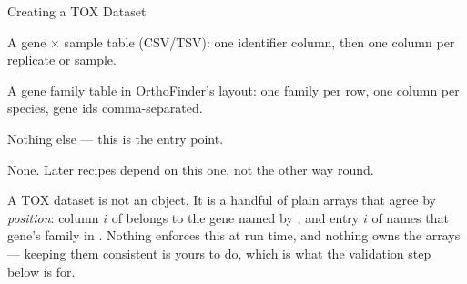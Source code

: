 
\begin{recipe}[label=sub:tox-dataset]{Creating a TOX Dataset}


\nomaintainer

\begin{requiredinputs}
  \item A gene $\times$ sample table (CSV/TSV): one identifier column, then one
        column per replicate or sample.
  \item A gene family table in OrthoFinder's  layout: one
        family per row, one column per species, gene ids comma-separated.
  \item Nothing else --- this is the entry point.
\end{requiredinputs}

\begin{prerequisites}
  \item None. Later recipes depend on this one, not the other way round.
\end{prerequisites}

\begin{note}
  A TOX dataset is not an object. It is a handful of plain arrays that agree by
  \emph{position}: column $i$ of  belongs to the gene named by
  , and entry $i$ of  names that
  gene's family in . Nothing enforces this at run time, and
  nothing owns the arrays --- keeping them consistent is yours to do, which is
  what the validation step below is for.
\end{note}


\end{recipe}
